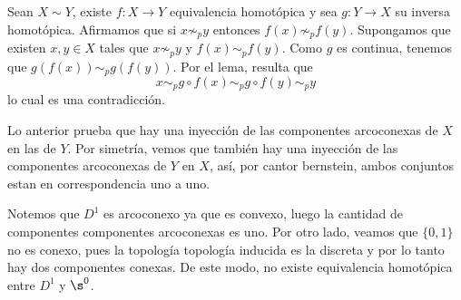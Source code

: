\documentclass{article}
\begin{document}
\noindent Sean $X\sim Y$, existe $f:X\to Y$ equivalencia homotópica y sea $g:Y\to X$ su inversa 
homotópica. Afirmamos que si $x\not\sim_{p}y$ entonces $f(x)\not\sim_{p}f(y)$. Supongamos que 
existen $x,y\in X$ tales que $x\not\sim_{p}y$ y $f(x)\sim_{p}f(y)$. Como $g$ es continua, tenemos
que $g(f(x))\sim_{p}g(f(y))$. Por el lema, resulta que
\begin{equation*}
    x\sim_{p}g\circ f(x)\sim_{p}g\circ f(y)\sim_{p}y
\end{equation*}
lo cual es una contradicción.

\vspace{2mm}
\noindent Lo anterior prueba que hay una inyección de las componentes arcoconexas de $X$ en las de
$Y$. Por simetría, vemos que también hay una inyección de las componentes arcoconexas de $Y$ en 
$X$, así, por cantor bernstein, ambos conjuntos estan en correspondencia uno a uno.

\vspace{2mm}
\noindent Notemos que $D^{1}$ es arcoconexo ya que es convexo, luego la cantidad de componentes 
componentes arcoconexas es uno. Por otro lado, veamos que $\{0,1\}$ no es conexo, pues la 
topología topología inducida es la discreta y por lo tanto hay dos componentes conexas. De este
modo, no existe equivalencia homotópica entre $D^{1}$ y $\s^{0}$.
\end{document}

